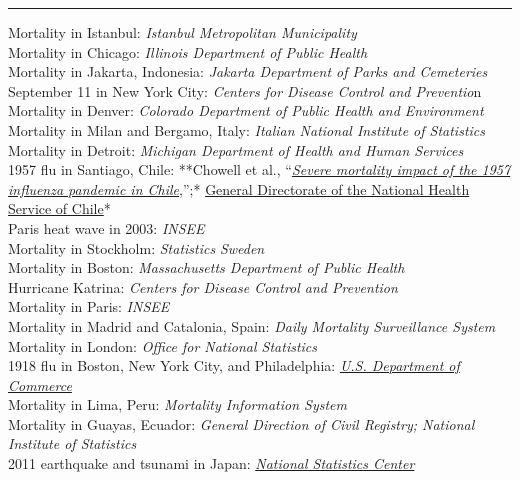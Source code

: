 \begin{center}\rule{0.5\linewidth}{\linethickness}\end{center}

Mortality in Istanbul: \emph{Istanbul Metropolitan Municipality}\\
Mortality in Chicago: \emph{Illinois Department of Public Health}\\
Mortality in Jakarta, Indonesia: \emph{Jakarta Department of Parks and
Cemeteries}\\
September 11 in New York City: \emph{Centers for Disease Control and
Preventio}n\\
Mortality in Denver: \emph{Colorado Department of Public Health and
Environment}\\
Mortality in Milan and Bergamo, Italy: \emph{Italian National Institute
of Statistics}\\
Mortality in Detroit: \emph{Michigan Department of Health and Human
Services}\\
1957 flu in Santiago, Chile: **Chowell et al.,
``\emph{\href{https://onlinelibrary.wiley.com/doi/full/10.1111/irv.12439}{Severe
mortality impact of the 1957 influenza pandemic in Chile}},'';*
\href{https://iris.paho.org/bitstream/handle/10665.2/14983/v44n4p316.pdf?sequence=1\&isAllowed=y}{General
Directorate of the National Health Service of Chile}*\\
Paris heat wave in 2003: \emph{INSEE}\\
Mortality in Stockholm: \emph{Statistics} \emph{Sweden}\\
Mortality in Boston: \emph{Massachusetts Department of Public Health}\\
Hurricane Katrina: \emph{Centers for Disease Control and Prevention}\\
Mortality in Paris: \emph{INSEE}\\
Mortality in Madrid and Catalonia, Spain: \emph{Daily Mortality
Surveillance System}\\
Mortality in London: \emph{Office for National Statistics}\\
1918 flu in Boston, New York City, and Philadelphia:
\emph{\href{https://www.cdc.gov/nchs/data/vsushistorical/mortstatsh_1918.pdf}{U.S.
Department of Commerce}}\\
Mortality in Lima, Peru: \emph{Mortality Information System}\\
Mortality in Guayas, Ecuador: \emph{General Direction of Civil Registry;
National Institute of Statistics}\\
2011 earthquake and tsunami in Japan:
\emph{\href{https://www.e-stat.go.jp/en/stat-search/files?page=1\&layout=datalist\&toukei=00450011\&tstat=000001028897\&cycle=7\&month=0\&tclass1=000001053058\&tclass2=000001053061\&tclass3=000001053065\&cycle_facet=tclass1\%3Atclass2\%3Atclass3\%3Acycle}{National
Statistics Center}}

